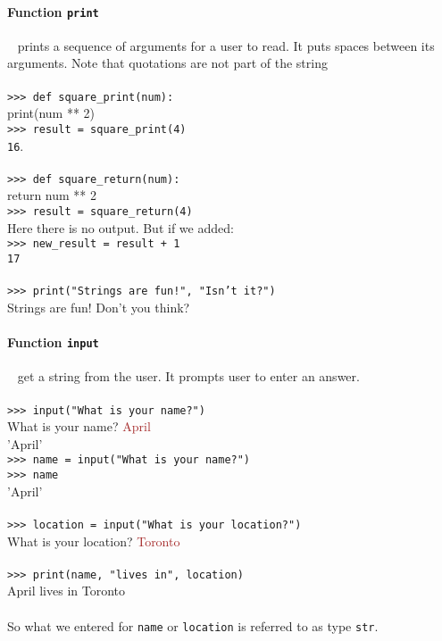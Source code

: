 \documentclass{article}
\begin{document}
{{{\paragraph{Function \texttt{print}} ~ prints a sequence of arguments for a user to read. It puts spaces between its arguments. Note that quotations are not part of the string\\
\\
\texttt{>>> def square\_print(num):}\\
\indent \indent print(num ** 2)\\
\texttt{>>> result = square\_print(4)}\\
\texttt{16}.\\
\\
\texttt{>>> def square\_return(num):}\\
\indent \indent return num ** 2 \\
\texttt{>>> result = square\_return(4)}\\
Here there is no output. But if we added: \\
\texttt{>>> new\_result = result + 1}\\
\texttt{17}\\
\\
\texttt{>>> print("Strings are fun!", "Isn't it?")}\\
Strings are fun! Don't you think? 

\paragraph{Function \texttt{input}} ~ get a string from the user. It prompts user to enter an answer.\\
\\
\texttt{>>> input("What is your name?")}\\
What is your name? \textcolor{brown}{April}\\
'April'\\
\texttt{>>> name = input("What is your name?")}\\
\texttt{>>> name}\\
'April'\\
\\
\texttt{>>> location = input("What is your location?")}\\
What is your location? \textcolor{brown}{Toronto}\\
\\
\texttt{>>> print(name, "lives in", location)}\\
April lives in Toronto\\
\\
So what we entered for \texttt{name} or \texttt{location} is referred to as type \texttt{str}. 

}}}
\end{document}
